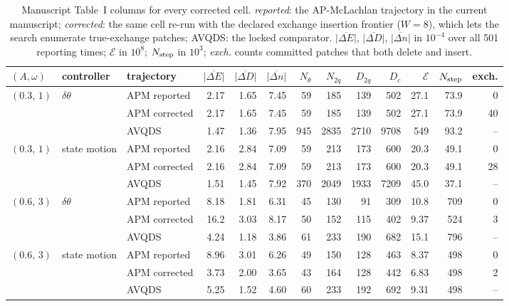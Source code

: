 \documentclass[10pt]{article}
\begin{document}
\begin{table}[H]\centering\scriptsize\setlength{\tabcolsep}{3pt}
\caption{Manuscript Table~I columns for every corrected cell.  \emph{reported}: the AP-McLachlan trajectory in the current manuscript; \emph{corrected}: the same cell re-run with the declared exchange insertion frontier ($W=8$), which lets the search enumerate true-exchange patches; AVQDS: the locked comparator.  $\overline{|\Delta E|}$, $\overline{|\Delta D|}$, $\overline{|\Delta n|}$ in $10^{-4}$ over all 501 reporting times; $\mathcal E$ in $10^{8}$; $N_{\rm step}$ in $10^{3}$; \emph{exch.} counts committed patches that both delete and insert.}
\begin{tabular}{lllrrrrrrrrrr}\toprule
$(A,\omega)$ & controller & trajectory & $\overline{|\Delta E|}$ & $\overline{|\Delta D|}$ & $\overline{|\Delta n|}$ & $N_\theta$ & $N_{2q}$ & $D_{2q}$ & $D_c$ & $\mathcal E$ & $N_{\rm step}$ & exch. \\ \midrule
$(0.3,\,1)$ & $\delta\theta$ & APM reported & 2.17 & 1.65 & 7.45 & 59 & 185 & 139 & 502 & 27.1 & 73.9 & 0 \\
 &  & APM corrected & 2.17 & 1.65 & 7.45 & 59 & 185 & 139 & 502 & 27.1 & 73.9 & 40 \\
 &  & AVQDS & 1.47 & 1.36 & 7.95 & 945 & 2835 & 2710 & 9708 & 549 & 93.2 & -- \\
\addlinespace[2pt]
$(0.3,\,1)$ & state motion & APM reported & 2.16 & 2.84 & 7.09 & 59 & 213 & 173 & 600 & 20.3 & 49.1 & 0 \\
 &  & APM corrected & 2.16 & 2.84 & 7.09 & 59 & 213 & 173 & 600 & 20.3 & 49.1 & 28 \\
 &  & AVQDS & 1.51 & 1.45 & 7.92 & 370 & 2049 & 1933 & 7209 & 45.0 & 37.1 & -- \\
\addlinespace[2pt]
$(0.6,\,3)$ & $\delta\theta$ & APM reported & 8.18 & 1.81 & 6.31 & 45 & 130 & 91 & 309 & 10.8 & 709 & 0 \\
 &  & APM corrected & 16.2 & 3.03 & 8.17 & 50 & 152 & 115 & 402 & 9.37 & 524 & 3 \\
 &  & AVQDS & 4.24 & 1.18 & 3.86 & 61 & 233 & 190 & 682 & 15.1 & 796 & -- \\
\addlinespace[2pt]
$(0.6,\,3)$ & state motion & APM reported & 8.96 & 3.01 & 6.26 & 49 & 150 & 128 & 463 & 8.37 & 498 & 0 \\
 &  & APM corrected & 3.73 & 2.00 & 3.65 & 43 & 164 & 128 & 442 & 6.83 & 498 & 2 \\
 &  & AVQDS & 5.25 & 1.52 & 4.60 & 60 & 233 & 192 & 692 & 9.31 & 498 & -- \\

\end{tabular}
\end{table}
\end{document}
